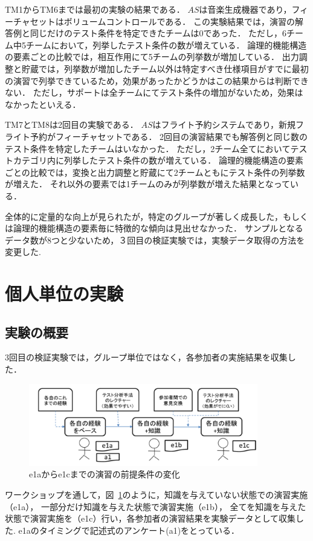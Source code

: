 TM1からTM6までは最初の実験の結果である．
$AS$は音楽生成機器であり，フィーチャセットはボリュームコントロールである．
この実験結果では，演習の解答例と同じだけのテスト条件を特定できたチームは0であった．
ただし，6チーム中5チームにおいて，列挙したテスト条件の数が増えている．
論理的機能構造の要素ごとの比較では，相互作用にて5チームの列挙数が増加している．
出力調整と貯蔵では，列挙数が増加したチーム以外は特定すべき仕様項目がすでに最初の演習で列挙できているため，効果があったかどうかはこの結果からは判断できない．
ただし，サポートは全チームにてテスト条件の増加がないため，効果はなかったといえる．

TM7とTM8は2回目の実験である．
$AS$はフライト予約システムであり，新規フライト予約がフィーチャセットである．
2回目の演習結果でも解答例と同じ数のテスト条件を特定したチームはいなかった．
ただし，2チーム全てにおいてテストカテゴリ内に列挙したテスト条件の数が増えている．
論理的機能構造の要素ごとの比較では，変換と出力調整と貯蔵にて2チームともにテスト条件の列挙数が増えた．
それ以外の要素では1チームのみが列挙数が増えた結果となっている．

全体的に定量的な向上が見られたが，特定のグループが著しく成長した，もしくは論理的機能構造の要素毎に特徴的な傾向は見出せなかった．
サンプルとなるデータ数が8つと少ないため，３回目の検証実験では，実験データ取得の方法を変更した.

\newpage
\section{個人単位の実験}
\subsection{実験の概要}
3回目の検証実験では，グループ単位ではなく，各参加者の実施結果を収集した\cite{yumoto2016ICST}．
\begin{figure}[h]
\begin{center}
\includegraphics[width=10cm]{./image/D-3-Fig8.png}
\caption{e1aからe1cまでの演習の前提条件の変化}
\label{fig:D-3-Fig8}
\end{center}
\end{figure}
ワークショップを通して，図~\ref{fig:D-3-Fig8}のように，知識を与えていない状態での演習実施（e1a），
一部分だけ知識を与えた状態で演習実施（e1b），
全てを知識を与えた状態で演習実施を（e1c）行い，各参加者の演習結果を実験データとして収集した.
e1aのタイミングで記述式のアンケート(a1)をとっている．

